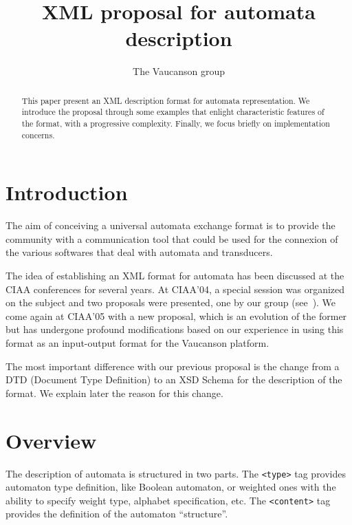 \documentclass[a4paper]{llncs}
\newcommand{\Vauc}{{\sc Vaucanson}\xspace}
\begin{document}
\title{XML proposal for automata description}

\author{The \Vauc group\inst{}}


\maketitle{}

\begin{abstract}
This paper present an XML description format for automata
representation. We introduce the proposal through some examples that
enlight characteristic features of the format, with a progressive
complexity. Finally, we focus briefly on implementation concerns.
\end{abstract}


\section{Introduction}

The aim of conceiving a universal automata exchange format is to
provide the community with a communication tool that could be used
for the connexion of the various softwares that deal with
automata and transducers.

The idea of establishing an XML format for automata has been
discussed at the CIAA conferences for several years.
At CIAA'04, a special session was organized on the subject and two
proposals were presented, one by our group (see~\cite{VXML04}).
We come again at CIAA'05 with a new proposal, which is an evolution of
the former but has undergone profound modifications based on our
experience in using this format as an input-output format
for the \Vauc platform.

The most important difference with our previous proposal is the change
from a DTD (Document Type Definition) to an XSD Schema for the
description of the format. 
We explain later the reason for this change.


\section{Overview}

The description of automata is structured in two parts.  The
\verb|<type>| tag provides automaton type definition, like Boolean
automaton, or weighted ones with the ability to specify weight type,
alphabet specification, etc. The \verb|<content>| tag provides the
definition of the automaton ``structure''.\\
\end{document}
